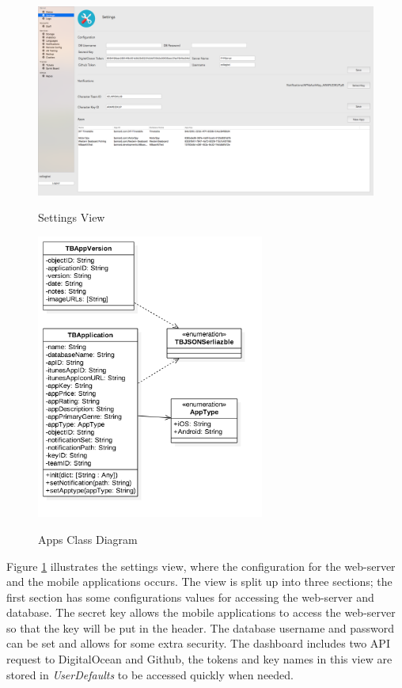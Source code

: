 \begin{figure}[!h]
    \caption{Settings View}
    \centering
    \includegraphics[width=150mm]{images/dashboard/settings}
    \label{fig:settings-view}
\end{figure}

\begin{figure}[!h]
    \caption{Apps Class Diagram}
    \centering
    \includegraphics[width=75mm]{images/classdiagrams/Settings}
    \label{fig:settings-cd}
\end{figure} 

Figure \ref{fig:settings-view} illustrates the settings view, where the configuration for the web-server and the mobile applications occurs. The view is split up into three sections; the first section has some configurations values for accessing the web-server and database. The secret key allows the mobile applications to access the web-server so that the key will be put in the header. The database username and password can be set and allows for some extra security. The dashboard includes two API request to DigitalOcean and Github, the tokens and key names in this view are stored in \textit{UserDefaults} to be accessed quickly when needed.

